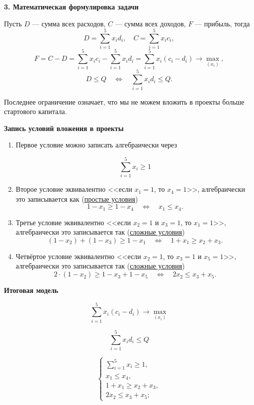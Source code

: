 \bigskip

\textbf{3. Математическая формулировка задачи}

Пусть $D$ --- сумма всех расходов, $C$ --- сумма всех доходов, $F$ --- прибыль, тогда
\[
D = \sum_{i=1}^5 x_i d_i, \quad C = \sum_{i=1}^5 x_i c_i,
\]
\[
F = C - D = \sum_{i=1}^5 x_i c_i - \sum_{i=1}^5 x_i d_i = \sum_{i=1}^5 x_i (c_i - d_i) \to \max_{(x_i)},
\]
\[
D \le Q \quad \Longleftrightarrow \quad \sum_{i=1}^5 x_i d_i \le Q.
\]

Последнее ограничение означает, что мы не можем вложить в проекты больше стартового капитала.

\bigskip

\textbf{Запись условий вложения в проекты}

\begin{enumerate}[nosep]
	\item Первое условие можно записать алгебраически через
	
	\[
	\sum_{i=1}^{5} x_i \ge 1
	\]
	
	\item Второе условие эквивалентно <<если $x_1 = 1$, то $x_4 = 1$>>, алгебраически это записывается как (\hyperref[fact:simple_conditions]{простые условия})
	\[
	1 - x_1 \ge 1 - x_4 \quad \Longleftrightarrow \quad x_1 \le x_4.
	\]
	
	\item Третье условие эквивалентно <<если $x_2 = 1$ и $x_3 = 1$, то $x_1 = 1$>>, алгебраически это записывается так (\hyperref[fact:complex_conditions]{сложные условия})
	\[
	(1 - x_2) + (1 - x_3) \ge 1 - x_1 \quad \Longleftrightarrow \quad 1 + x_1 \ge x_2 + x_3.
	\]
	
	\item Четвёртое условие эквивалентно <<если $x_2 = 1$, то $x_3 = 1$ и $x_5 = 1$>>, алгебраически это записывается так (\hyperref[fact:complex_conditions]{сложные условия})
	\[
	2 \cdot (1 - x_2) \ge 1 - x_3 + 1 - x_5 \quad \Longleftrightarrow \quad 2x_2 \le x_3 + x_5.
	\]
\end{enumerate}

\bigskip

\textbf{Итоговая модель}

\[
\sum_{i=1}^5 x_i (c_i - d_i) \to \max_{(x_i)}
\]

\[
\sum_{i=1}^5 x_i d_i \le Q
\]

\[
\begin{cases}
	\sum\limits_{i=1}^{5} x_i \ge 1, \\
	x_1 \le x_4, \\
	1 + x_1 \ge x_2 + x_3, \\
	2x_2 \le x_3 + x_5;
\end{cases}
\]

